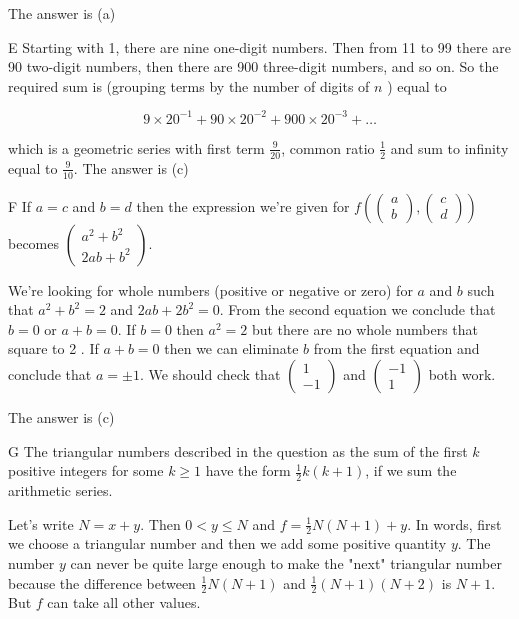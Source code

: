 \documentclass[10pt]{article}
\begin{document}
The answer is (a)

E Starting with 1, there are nine one-digit numbers. Then from 11 to 99 there are 90 two-digit numbers, then there are 900 three-digit numbers, and so on. So the required sum is (grouping terms by the number of digits of $n$ ) equal to

$$
9 \times 20^{-1}+90 \times 20^{-2}+900 \times 20^{-3}+\ldots
$$

which is a geometric series with first term $\frac{9}{20}$, common ratio $\frac{1}{2}$ and sum to infinity equal to $\frac{9}{10}$. The answer is (c)

F If $a=c$ and $b=d$ then the expression we're given for $f\left(\left(\begin{array}{l}a \\ b\end{array}\right),\left(\begin{array}{l}c \\ d\end{array}\right)\right)$ becomes $\left(\begin{array}{c}a^{2}+b^{2} \\ 2 a b+b^{2}\end{array}\right)$.

We're looking for whole numbers (positive or negative or zero) for $a$ and $b$ such that $a^{2}+b^{2}=2$ and $2 a b+2 b^{2}=0$. From the second equation we conclude that $b=0$ or $a+b=0$. If $b=0$ then $a^{2}=2$ but there are no whole numbers that square to 2 . If $a+b=0$ then we can eliminate $b$ from the first equation and conclude that $a= \pm 1$. We should check that $\left(\begin{array}{c}1 \\ -1\end{array}\right)$ and $\left(\begin{array}{c}-1 \\ 1\end{array}\right)$ both work.

The answer is (c)

G The triangular numbers described in the question as the sum of the first $k$ positive integers for some $k \geq 1$ have the form $\frac{1}{2} k(k+1)$, if we sum the arithmetic series.

Let's write $N=x+y$. Then $0<y \leq N$ and $f=\frac{1}{2} N(N+1)+y$. In words, first we choose a triangular number and then we add some positive quantity $y$. The number $y$ can never be quite large enough to make the "next" triangular number because the difference between $\frac{1}{2} N(N+1)$ and $\frac{1}{2}(N+1)(N+2)$ is $N+1$. But $f$ can take all other values.
\end{document}
